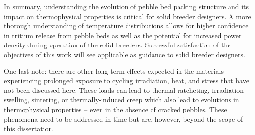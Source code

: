 In summary, understanding the evolution of pebble bed packing structure and its impact on thermophysical properties is critical for solid breeder designers. A more thorough understanding of temperature distributions allows for higher confidence in tritium release from pebble beds as well as the potential for increased power density during operation of the solid breeders. Successful satisfaction of the objectives of this work will see applicable as guidance to solid breeder designers.

One last note: there are other long-term effects expected in the materials experiencing prolonged exposure to cycling irradiation, heat, and stress that have not been discussed here. These loads can lead to thermal ratcheting, irradiation swelling, sintering, or thermally-induced creep which also lead to evolutions in thermophysical properties -- even in the absence of cracked pebbles. These phenomena need to be addressed in time but are, however, beyond the scope of this dissertation. 
